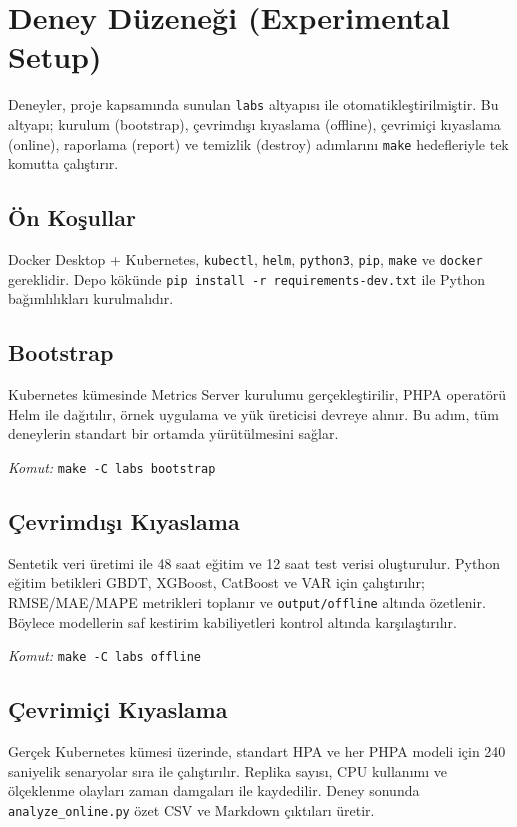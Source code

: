 \section{Deney Düzeneği (Experimental Setup)}

Deneyler, proje kapsamında sunulan \texttt{labs} altyapısı ile otomatikleştirilmiştir. Bu altyapı; kurulum (bootstrap), çevrimdışı kıyaslama (offline), çevrimiçi kıyaslama (online), raporlama (report) ve temizlik (destroy) adımlarını \texttt{make} hedefleriyle tek komutta çalıştırır.

\subsection{Ön Koşullar}

Docker Desktop + Kubernetes, \texttt{kubectl}, \texttt{helm}, \texttt{python3}, \texttt{pip}, \texttt{make} ve \texttt{docker} gereklidir. Depo kökünde \texttt{pip install -r requirements-dev.txt} ile Python bağımlılıkları kurulmalıdır.

\subsection{Bootstrap}

Kubernetes kümesinde Metrics Server kurulumu gerçekleştirilir, PHPA operatörü Helm ile dağıtılır, örnek uygulama ve yük üreticisi devreye alınır. Bu adım, tüm deneylerin standart bir ortamda yürütülmesini sağlar.

\noindent \textit{Komut:} \texttt{make -C labs bootstrap}

\subsection{Çevrimdışı Kıyaslama}

Sentetik veri üretimi ile 48 saat eğitim ve 12 saat test verisi oluşturulur. Python eğitim betikleri GBDT, XGBoost, CatBoost ve VAR için çalıştırılır; RMSE/MAE/MAPE metrikleri toplanır ve \texttt{output/offline} altında özetlenir. Böylece modellerin saf kestirim kabiliyetleri kontrol altında karşılaştırılır.

\noindent \textit{Komut:} \texttt{make -C labs offline}

\subsection{Çevrimiçi Kıyaslama}

Gerçek Kubernetes kümesi üzerinde, standart HPA ve her PHPA modeli için 240 saniyelik senaryolar sıra ile çalıştırılır. Replika sayısı, CPU kullanımı ve ölçeklenme olayları zaman damgaları ile kaydedilir. Deney sonunda \texttt{analyze\_online.py} özet CSV ve Markdown çıktıları üretir.

